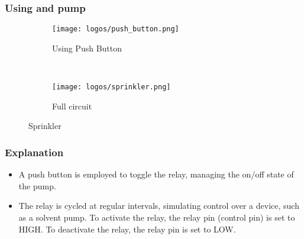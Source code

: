 \documentclass[table,french,english]{rapportCS}
\begin{document}


\subsubsection{ Using  and pump}
\begin{figure}[h]
    \centering
    \begin{subfigure}{0.4\textwidth}\label{sec:figone}
        \centering
        \texttt{[image: logos/push\_button.png]}
        \caption{Using Push Button}
    \end{subfigure}\hspace{0.1\textwidth}%
    \\
    \vspace{0.5cm}
    \begin{subfigure}{0.5\textwidth}\label{sec:figtwo}
        \centering
        \texttt{[image: logos/sprinkler.png]}
        \caption{Full circuit}
    \end{subfigure}
    \caption{Sprinkler}
\end{figure}

\subsubsection*{Explanation}
\begin{itemize}[label=$\bullet$]
    \item A push button is employed to toggle the relay, managing the on/off state of the pump.
    \item The relay is cycled at regular intervals, simulating control over a device, such as a solvent pump.
     To activate the relay, the relay pin (control pin) is set to HIGH.
     To deactivate the relay, the relay pin is set to LOW.
\end{itemize}
\end{document}
